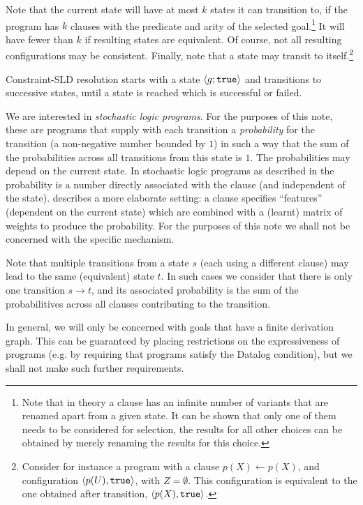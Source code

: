 \documentclass{article} %
\begin{document}
Note that the current state will have at most $k$ states it can transition to, if the program has $k$ clauses with the predicate and arity of the selected goal.\footnote{Note that in theory a clause has an infinite number of variants that are renamed apart from a given state. It can be shown that only one of them needs to be considered for selection, the results for all other choices can be obtained by merely renaming the results for this choice.} It will have fewer than $k$ if resulting states are equivalent. Of course, not all resulting configurations may be consistent.  Finally, note that a state may transit to itself.\footnote{Consider for instance a program with a clause $p(X)\leftarrow p(X)$, and configuration $\langle p(U),\mbox{\tt true}\rangle$, with $Z=\emptyset$. This configuration is equivalent to the one obtained after transition, $\langle p(X),\mbox{\tt true}\rangle$.} 

Constraint-SLD resolution starts with a state $\langle g;\mbox{\tt true}\rangle$ and transitions to successive states, until a state is reached which is successful or failed. 

We are interested in {\em stochastic logic programs}. For the purposes of this note, these are programs that supply with each transition a {\em probability} for the transition (a non-negative number bounded by $1$) in such a way that the sum of the probabilities across all transitions from this state is $1$. The probabilities may depend on the current state. In stochastic logic programs as described in \cite{Muggleton-1996} the probability is a number directly associated with the clause (and independent of the state). \cite{Cohen-2015} describes a more elaborate setting: a clause specifies ``features'' (dependent on the current state) which are combined with a (learnt) matrix of weights to produce the probability. For the purposes of this note we shall not be concerned with the specific mechanism. 

Note that multiple transitions from a state $s$ (each using a different clause) may lead to the same (equivalent) state $t$. In such cases we consider that there is only one transition $s \rightarrow t$, and its associated probability is the sum of the probabilitives across all clauses contributing to the transition. 

In general, we will only be concerned with goals that have a finite derivation graph. This can be guaranteed by placing restrictions on the expressiveness of programs (e.g. by requiring that programs satisfy the Datalog condition), but we shall not make such further requirements. 
\end{document}
